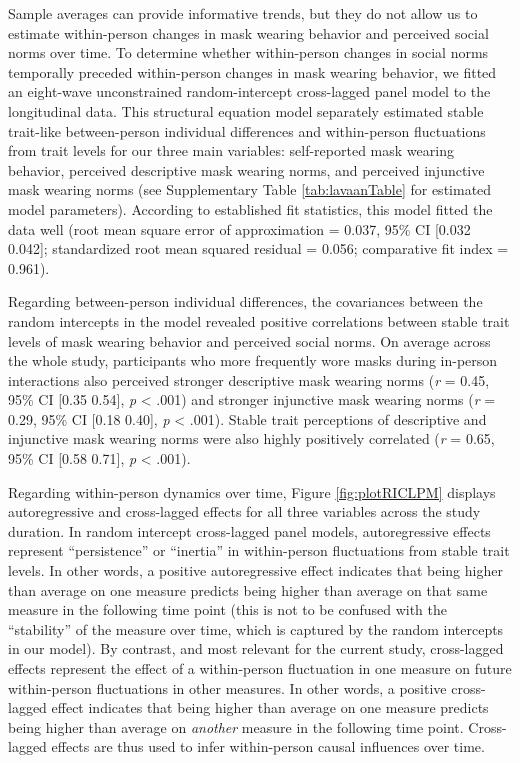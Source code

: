 \documentclass[
  english,
  man,floatsintext]{apa6}
\begin{document}
Sample averages can provide informative trends, but they do not allow us to estimate within-person changes in mask wearing behavior and perceived social norms over time. To determine whether within-person changes in social norms temporally preceded within-person changes in mask wearing behavior, we fitted an eight-wave unconstrained random-intercept cross-lagged panel model to the longitudinal data. This structural equation model separately estimated stable trait-like between-person individual differences and within-person fluctuations from trait levels for our three main variables: self-reported mask wearing behavior, perceived descriptive mask wearing norms, and perceived injunctive mask wearing norms (see Supplementary Table \ref{tab:lavaanTable} for estimated model parameters). According to established fit statistics, this model fitted the data well (root mean square error of approximation = 0.037, 95\% CI {[}0.032 0.042{]}; standardized root mean squared residual = 0.056; comparative fit index = 0.961).

Regarding between-person individual differences, the covariances between the random intercepts in the model revealed positive correlations between stable trait levels of mask wearing behavior and perceived social norms. On average across the whole study, participants who more frequently wore masks during in-person interactions also perceived stronger descriptive mask wearing norms (\emph{r} = 0.45, 95\% CI {[}0.35 0.54{]}, \emph{p} \textless{} .001) and stronger injunctive mask wearing norms (\emph{r} = 0.29, 95\% CI {[}0.18 0.40{]}, \emph{p} \textless{} .001). Stable trait perceptions of descriptive and injunctive mask wearing norms were also highly positively correlated (\emph{r} = 0.65, 95\% CI {[}0.58 0.71{]}, \emph{p} \textless{} .001).

Regarding within-person dynamics over time, Figure \ref{fig:plotRICLPM} displays autoregressive and cross-lagged effects for all three variables across the study duration. In random intercept cross-lagged panel models, autoregressive effects represent ``persistence'' or ``inertia'' in within-person fluctuations from stable trait levels. In other words, a positive autoregressive effect indicates that being higher than average on one measure predicts being higher than average on that same measure in the following time point (this is not to be confused with the ``stability'' of the measure over time, which is captured by the random intercepts in our model). By contrast, and most relevant for the current study, cross-lagged effects represent the effect of a within-person fluctuation in one measure on future within-person fluctuations in other measures. In other words, a positive cross-lagged effect indicates that being higher than average on one measure predicts being higher than average on \emph{another} measure in the following time point. Cross-lagged effects are thus used to infer within-person causal influences over time.
\end{document}
